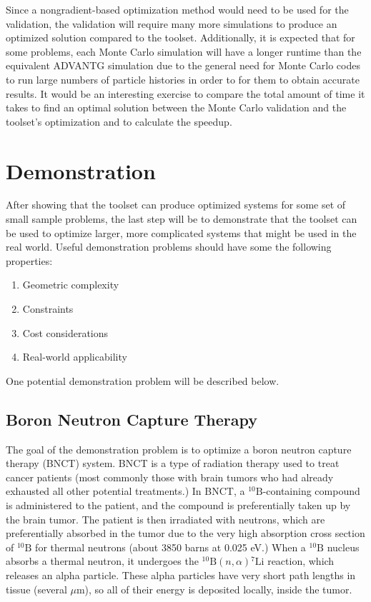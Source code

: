 Since a nongradient-based optimization method would need to be used for the validation, the validation will require many more simulations to produce an optimized solution compared to the toolset.
Additionally, it is expected that for some problems, each Monte Carlo simulation will have a longer runtime than the equivalent ADVANTG simulation due to the general need for Monte Carlo codes to run large numbers of particle histories in order to for them to obtain accurate results.
It would be an interesting exercise to compare the total amount of time it takes to find an optimal solution between the Monte Carlo validation and the toolset's optimization and to calculate the speedup.

\section{Demonstration}
\label{sec:proposal:demonstration}

After showing that the toolset can produce optimized systems for some set of small sample problems, the last step will be to demonstrate that the toolset can be used to optimize larger, more complicated systems that might be used in the real world.
Useful demonstration problems should have some the following properties:
\begin{enumerate}
  \item Geometric complexity
  \item Constraints
  \item Cost considerations
  \item Real-world applicability
\end{enumerate}
One potential demonstration problem will be described below.

\subsection{Boron Neutron Capture Therapy}
\label{sec:proposal:bnct}

The goal of the demonstration problem is to optimize a boron neutron capture therapy (BNCT) system.
BNCT is a type of radiation therapy used to treat cancer patients (most commonly those with brain tumors who had already exhausted all other potential treatments.)
In BNCT, a ${}^{10}\text{B}$-containing compound is administered to the patient, and the compound is preferentially taken up by the brain tumor.
The patient is then irradiated with neutrons, which are preferentially absorbed in the tumor due to the very high absorption cross section of ${}^{10}\text{B}$ for thermal neutrons (about 3850 barns at 0.025 eV.)
When a ${}^{10}\text{B}$ nucleus absorbs a thermal neutron, it undergoes the ${}^{10}\text{B}\left(n,\alpha\right){}^{7}\text{Li}$ reaction, which releases an alpha particle.
These alpha particles have very short path lengths in tissue (several $\mu$m), so all of their energy is deposited locally, inside the tumor.

